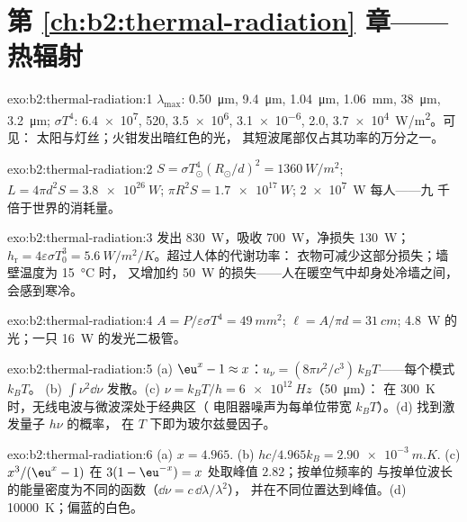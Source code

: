 \section*{第 \ref{ch:b2:thermal-radiation} 章——热辐射}

\begin{solution}{exo:b2:thermal-radiation:1}
$\lambda_{\max}$: \qty{0.50}{\micro m}, \qty{9.4}{\micro m}, \qty{1.04}{\micro m},
\qty{1.06}{mm}, \qty{38}{\micro m}, \qty{3.2}{\micro m}; $\sigma T^4$: \qty{6.4e7}{},
\qty{520}{}, \qty{3.5e6}{}, \qty{3.1e-6}{}, \qty{2.0}{}, \qty{3.7e4}{W/m^2}。可见：
太阳与灯丝；火钳发出暗红色的光，
其短波尾部仅占其功率的万分之一。
\end{solution}

\begin{solution}{exo:b2:thermal-radiation:2}
$S = \sigma T_\odot^4(R_\odot/d)^2 = \qty{1360}{W/m^2}$; $L = 4\pi d^2S =
\qty{3.8e26}{W}$; $\pi R^2S = \qty{1.7e17}{W}$; \qty{2e7}{W} 每人——九
千倍于世界的消耗量。
\end{solution}

\begin{solution}{exo:b2:thermal-radiation:3}
发出 \qty{830}{W}，吸收 \qty{700}{W}，净损失 \qty{130}{W}；$h_{\text{r}} =
4\varepsilon\sigma T_0^3 = \qty{5.6}{W/m^2/K}$。超过人体的代谢功率：
衣物可减少这部分损失；墙壁温度为 \qty{15}{\celsius} 时，
又增加约 \qty{50}{W} 的损失——人在暖空气中却身处冷墙之间，会感到寒冷。
\end{solution}

\begin{solution}{exo:b2:thermal-radiation:4}
$A = P/\varepsilon\sigma T^4 = \qty{49}{mm^2}$; $\ell = A/\pi d = \qty{31}{cm}$;
\qty{4.8}{W} 的光；一只 \qty{16}{W} 的发光二极管。
\end{solution}

\begin{solution}{exo:b2:thermal-radiation:5}
(a) $\eu^x - 1 \approx x$：$u_\nu = (8\pi\nu^2/c^3)\,k_BT$——每个模式 $k_BT$。
(b) $\int\nu^2\dd\nu$ 发散。(c) $\nu = k_BT/h = \qty{6e12}{Hz}$（\qty{50}{\micro m}）：
在 \qty{300}{K} 时，无线电波与微波深处于经典区（
电阻器噪声为每单位带宽 $k_BT$）。(d) 找到激发量子 $h\nu$ 的概率，
在 $T$ 下即为玻尔兹曼因子。
\end{solution}

\begin{solution}{exo:b2:thermal-radiation:6}
(a) $x = 4.965$. (b) $hc/4.965k_B = \qty{2.90e-3}{m.K}$. (c) $x^3/(\eu^x - 1)$
在 $3(1 - \eu^{-x}) = x$ 处取峰值 $2.82$；按单位频率的
与按单位波长的能量密度为不同的函数（$\dd\nu = c\,\dd\lambda/\lambda^2$），
并在不同位置达到峰值。(d) \qty{10000}{K}；偏蓝的白色。
\end{solution}

